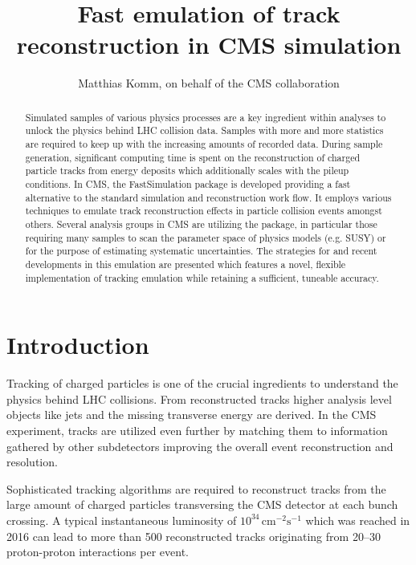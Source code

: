 \documentclass[a4paper]{jpconf}
\begin{document}
\title{Fast emulation of track reconstruction in CMS simulation}

\author{Matthias Komm, on behalf of the CMS collaboration}

\address{Centre for Cosmology, Particle Physics and Phenomenology,
Universit\'e catholique de Louvain, Louvain-la-Neuve, BELGIUM}


\begin{abstract}
Simulated samples of various physics processes are a key ingredient within analyses to unlock the physics behind LHC collision data. Samples with more and more statistics are required to keep up with the increasing amounts of recorded data. During sample generation, significant computing time is spent on the reconstruction of charged particle tracks from energy deposits which additionally scales with the pileup conditions. In CMS, the FastSimulation package is developed providing a fast alternative to the standard simulation and reconstruction work flow. It employs various techniques to emulate track reconstruction effects in particle collision events amongst others. Several analysis groups in CMS are utilizing the package, in particular those requiring many samples to scan the parameter space of physics models (e.g. SUSY) or for the purpose of estimating systematic uncertainties. The strategies for and recent developments in this emulation are presented which features a novel, flexible implementation of tracking emulation while retaining a sufficient, tuneable accuracy.
\end{abstract}

\section{Introduction}
Tracking of charged particles is one of the crucial ingredients to understand the physics behind LHC collisions. From reconstructed tracks higher analysis level objects like jets and the missing transverse energy are derived. In the CMS experiment, tracks are utilized even further by matching them to information gathered by other subdetectors improving the overall event reconstruction and resolution.

Sophisticated tracking algorithms are required to reconstruct tracks from the large amount of charged particles transversing the CMS detector at each bunch crossing. A typical instantaneous luminosity of $10^{34}\,\mathrm{cm}^{-2}\mathrm{s}^{-1}$ which was reached in 2016 can lead to more than 500 reconstructed tracks originating from 20--30 proton-proton interactions per event.
\end{document}
